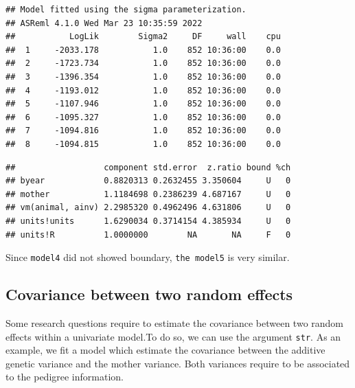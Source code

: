 \documentclass[
  12pt,
]{book}
\newenvironment{Shaded}{\begin{snugshade}}{\end{snugshade}}
\newcommand{\KeywordTok}[1]{\textcolor[rgb]{0.13,0.29,0.53}{\textbf{#1}}}
\newcommand{\NormalTok}[1]{#1}
\newcommand{\OperatorTok}[1]{\textcolor[rgb]{0.81,0.36,0.00}{\textbf{#1}}}
\begin{document}
\begin{verbatim}
## Model fitted using the sigma parameterization.
## ASReml 4.1.0 Wed Mar 23 10:35:59 2022
##           LogLik        Sigma2     DF     wall    cpu
##  1     -2033.178           1.0    852 10:36:00    0.0
##  2     -1723.734           1.0    852 10:36:00    0.0
##  3     -1396.354           1.0    852 10:36:00    0.0
##  4     -1193.012           1.0    852 10:36:00    0.0
##  5     -1107.946           1.0    852 10:36:00    0.0
##  6     -1095.327           1.0    852 10:36:00    0.0
##  7     -1094.816           1.0    852 10:36:00    0.0
##  8     -1094.815           1.0    852 10:36:00    0.0
\end{verbatim}

\begin{Shaded}
\end{Shaded}

\begin{verbatim}
##                  component std.error  z.ratio bound %ch
## byear            0.8820313 0.2632455 3.350604     U   0
## mother           1.1184698 0.2386239 4.687167     U   0
## vm(animal, ainv) 2.2985320 0.4962496 4.631806     U   0
## units!units      1.6290034 0.3714154 4.385934     U   0
## units!R          1.0000000        NA       NA     F   0
\end{verbatim}

Since \texttt{model4} did not showed boundary, \texttt{the\ model5} is very similar.

\hypertarget{covariance-between-two-random-effects}{%
\subsection{Covariance between two random effects}\label{covariance-between-two-random-effects}}

Some research questions require to estimate the covariance between two random effects within a univariate model.To do so, we can use the argument \texttt{str}.
As an example, we fit a model which estimate the covariance between the additive genetic variance and the mother variance. Both variances require to be associated to the pedigree information.
\end{document}

